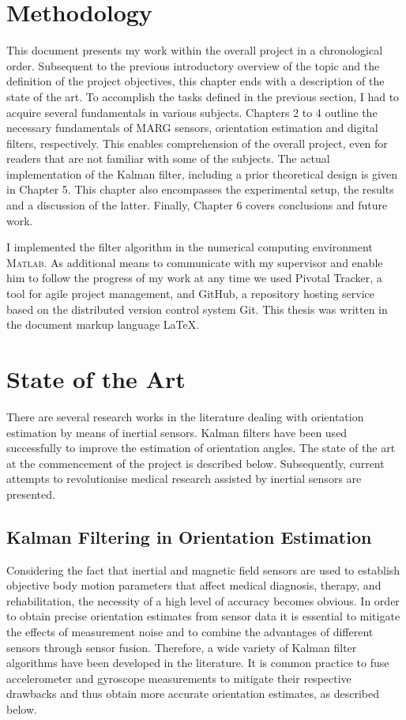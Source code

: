 \section{Methodology}

This document presents my work within the overall project in a chronological order. Subsequent to the previous introductory overview of the topic and the definition of the project objectives, this chapter ends with a description of the state of the art. To accomplish the tasks defined in the previous section, I had to acquire several fundamentals in various subjects. Chapters 2 to 4 outline the necessary fundamentals of MARG sensors, orientation estimation and digital filters, respectively.  This enables comprehension of the overall project, even for readers that are not familiar with some of the subjects. The actual implementation of the Kalman filter, including a prior theoretical design is given in Chapter 5. This chapter also encompasses the experimental setup, the results and a discussion of the latter. Finally, Chapter 6 covers conclusions and future work.

I implemented the filter algorithm in the numerical computing environment \textsc{Matlab}\textsuperscript{\textregistered}. As additional means to communicate with my supervisor and enable him to follow the progress of my work at any time we used Pivotal Tracker, a tool for agile project management, and GitHub, a repository hosting service based on the distributed version control system Git. This thesis was written in the document markup language \LaTeX{}.
 
\section{State of the Art}\label{sec:state_of_the_art}

There are several research works in the literature dealing with orientation estimation by means of inertial sensors. Kalman filters have been used successfully to improve the estimation of orientation angles. The state of the art at the commencement of the project is described below. Subsequently, current attempts to revolutionise medical research assisted by inertial sensors are presented.

\subsection{Kalman Filtering in Orientation Estimation}

Considering the fact that inertial and magnetic field sensors are used to establish objective body motion parameters that affect medical diagnosis, therapy, and rehabilitation, the necessity of a high level of accuracy becomes obvious. In order to obtain precise orientation estimates from sensor data it is essential to mitigate the effects of measurement noise and to combine the advantages of different  sensors through sensor fusion. Therefore, a wide variety of Kalman filter algorithms have been developed in the literature. It is common practice to fuse accelerometer and gyroscope measurements to mitigate their respective drawbacks and thus obtain more accurate orientation estimates, as described below.

